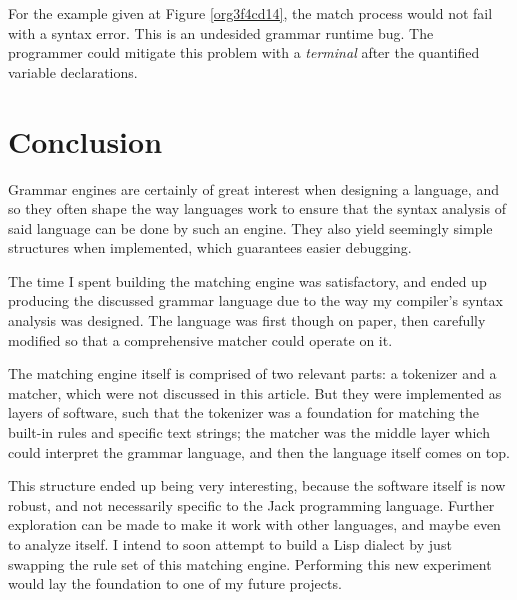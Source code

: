 \documentclass[a4paper,11pt,oneside]{article}
\begin{document}
For the example given at Figure \ref{org3f4cd14}, the match process would
not fail with a syntax error. This is an undesided grammar runtime
bug. The programmer could mitigate this problem with a \emph{terminal} after
the quantified variable declarations.

\section{Conclusion}
\label{sec:org4fe67cc}

Grammar engines are certainly of great interest when designing a
language, and so they often shape the way languages work to ensure
that the syntax analysis of said language can be done by such an
engine. They also yield seemingly simple structures when implemented,
which guarantees easier debugging.

The time I spent building the matching engine was satisfactory, and
ended up producing the discussed grammar language due to the way my
compiler's syntax analysis was designed. The language was first though
on paper, then carefully modified so that a comprehensive matcher
could operate on it.

The matching engine itself is comprised of two relevant parts: a
tokenizer and a matcher, which were not discussed in this article. But
they were implemented as layers of software, such that the tokenizer
was a foundation for matching the built-in rules and specific text
strings; the matcher was the middle layer which could interpret the
grammar language, and then the language itself comes on top.

This structure ended up being very interesting, because the software
itself is now robust, and not necessarily specific to the Jack
programming language. Further exploration can be made to make it work
with other languages, and maybe even to analyze itself. I intend to
soon attempt to build a Lisp dialect by just swapping the rule set of
this matching engine. Performing this new experiment would lay the
foundation to one of my future projects.



\label{orgf8faffd}



\end{document}
